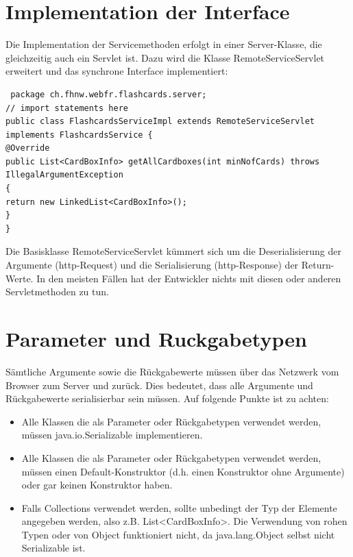 \documentclass[a4paper,10pt]{scrreprt}
\begin{document}
\section{Implementation der Interface}
Die Implementation der Servicemethoden erfolgt in einer Server-Klasse, die gleichzeitig auch ein
Servlet ist. Dazu wird die Klasse RemoteServiceServlet erweitert und das synchrone Interface
implementiert:
\begin{lstlisting}
 package ch.fhnw.webfr.flashcards.server;
// import statements here
public class FlashcardsServiceImpl extends RemoteServiceServlet
implements FlashcardsService {
@Override
public List<CardBoxInfo> getAllCardboxes(int minNofCards) throws IllegalArgumentException
{
return new LinkedList<CardBoxInfo>();
}
}
\end{lstlisting}
Die Basisklasse RemoteServiceServlet kümmert sich um die Deserialisierung der Argumente
(http-Request) und die Serialisierung (http-Response) der Return-Werte. In den meisten Fällen hat
der Entwickler nichts mit diesen oder anderen Servletmethoden zu tun.

\section{Parameter und Ruckgabetypen}
Sämtliche Argumente sowie die Rückgabewerte müssen über das Netzwerk vom Browser zum Server
und zurück. Dies bedeutet, dass alle Argumente und Rückgabewerte serialisierbar sein müssen. Auf
folgende Punkte ist zu achten:
\begin{itemize}
 \item Alle Klassen die als Parameter oder Rückgabetypen verwendet werden, müssen
java.io.Serializable implementieren.
\item Alle Klassen die als Parameter oder Rückgabetypen verwendet werden, müssen einen
Default-Konstruktor (d.h. einen Konstruktor ohne Argumente) oder gar keinen Konstruktor
haben.
\item Falls Collections verwendet werden, sollte unbedingt der Typ der Elemente angegeben
werden, also z.B. List<CardBoxInfo>. Die Verwendung von rohen Typen oder von
Object funktioniert nicht, da java.lang.Object selbst nicht Serializable ist.
\end{itemize}
\end{document}

